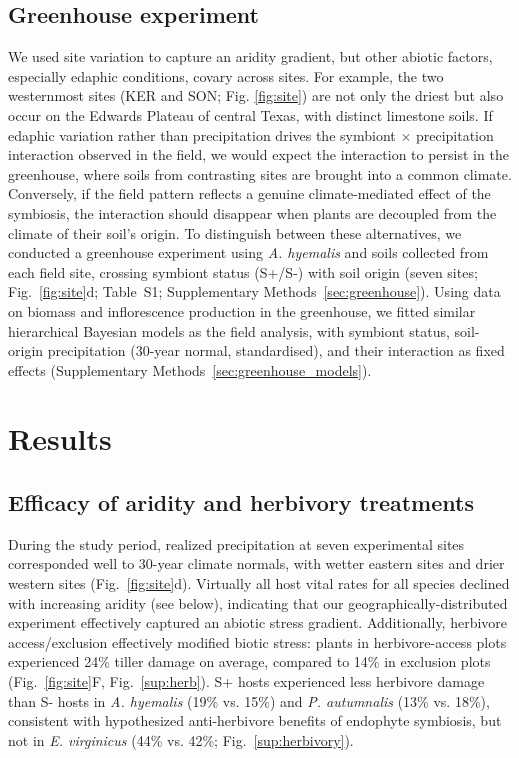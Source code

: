 \documentclass[12pt]{article}\usepackage[]{graphicx}\usepackage[dvipsnames]{xcolor}
\begin{document}
\subsection*{Greenhouse experiment}
We used site variation to capture an aridity gradient, but other abiotic factors, especially edaphic conditions, covary across sites. 
For example, the two westernmost sites (KER and SON; Fig. \ref{fig:site}) are not only the driest but also occur on the Edwards Plateau of central Texas, with distinct limestone soils.
If edaphic variation rather than precipitation drives the symbiont $\times$ precipitation interaction observed in the field, we would expect the interaction to persist in the greenhouse, where soils from contrasting sites are brought into a common climate. 
Conversely, if the field pattern reflects a genuine climate-mediated effect of the symbiosis, the interaction should disappear when plants are decoupled from the climate of their soil's origin. 
To distinguish between these alternatives, we conducted a greenhouse experiment using \textit{A. hyemalis} and soils collected from each field site, crossing symbiont status (S+/S-) with soil origin (seven sites; Fig.~\ref{fig:site}d; 
Table~S1; Supplementary Methods~\ref{sec:greenhouse}).
Using data on biomass and inflorescence production in the greenhouse, we fitted similar hierarchical Bayesian models as the field analysis, with symbiont status, soil-origin precipitation (30-year normal, standardised), and their interaction as fixed effects (Supplementary Methods~\ref{sec:greenhouse_models}).

\section*{Results}
\subsection*{Efficacy of aridity and herbivory treatments}
During the study period, realized precipitation at seven experimental sites corresponded well to 30-year climate normals, with wetter eastern sites and drier western sites (Fig.~\ref{fig:site}d). 
Virtually all host vital rates for all species declined with increasing aridity (see below), indicating that our geographically-distributed experiment effectively captured an abiotic stress gradient. 
Additionally, herbivore access/exclusion effectively modified biotic stress: plants in herbivore-access plots experienced 24\% tiller damage on average, compared to 14\% in exclusion plots (Fig.~\ref{fig:site}F, Fig.~\ref{sup:herb}). 
S+ hosts experienced less herbivore damage than S- hosts in \textit{A. hyemalis} (19\% vs. 15\%) and \textit{P. autumnalis} (13\% vs. 18\%), consistent with 
hypothesized anti-herbivore benefits of endophyte symbiosis, but not in  \textit{E. virginicus} (44\% vs. 42\%; Fig.~\ref{sup:herbivory}).
\end{document}
